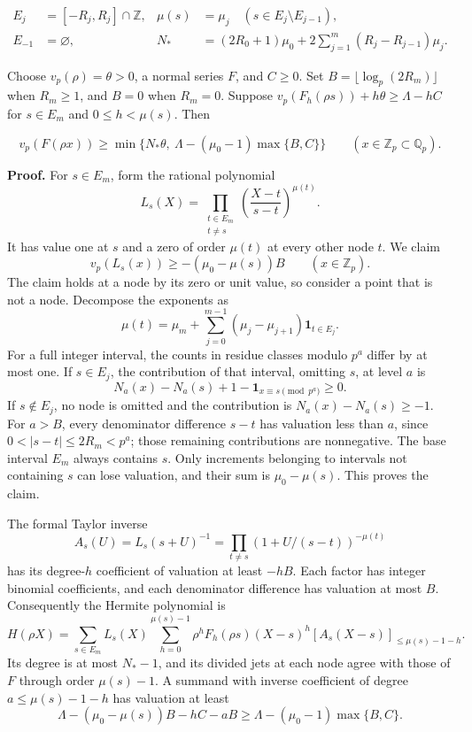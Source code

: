 \documentclass[
  11pt,
  a4paper,
]{article}
\begin{document}
\[
\begin{aligned}
E_j&=[-R_j,R_j]\cap\mathbb Z,&
\mu(s)&=\mu_j\quad(s\in E_j\setminus E_{j-1}),\\
E_{-1}&=\varnothing,&
N_*&=(2R_0+1)\mu_0+
2\sum_{j=1}^m(R_j-R_{j-1})\mu_j .
\end{aligned}
\tag{10.247}
\]

Choose \(v_p(\rho)=\theta>0\), a normal series \(F\), and \(C\ge0\). Set
\(B=\lfloor\log_p(2R_m)\rfloor\) when \(R_m\ge1\), and \(B=0\) when
\(R_m=0\). Suppose \(v_p(F_h(\rho s))+h\theta\ge\Lambda-hC\) for
\(s\in E_m\) and \(0\le h<\mu(s)\). Then

\[
v_p(F(\rho x))\ge
\min\{N_*\theta,\ \Lambda-(\mu_0-1)\max\{B,C\}\}
\qquad(x\in\mathbb Z_p\subset\mathbb Q_p).
\tag{10.248}
\]

\textbf{Proof.} For \(s\in E_m\), form the rational polynomial \[
L_s(X)=\prod_{\substack{t\in E_m\\t\ne s}}
\left(\frac{X-t}{s-t}\right)^{\mu(t)}.
\] It has value one at \(s\) and a zero of order \(\mu(t)\) at every
other node \(t\). We claim \[
v_p(L_s(x))\ge-(\mu_0-\mu(s))B\qquad(x\in\mathbb Z_p).
\] The claim holds at a node by its zero or unit value, so consider a
point that is not a node. Decompose the exponents as \[
\mu(t)=\mu_m+\sum_{j=0}^{m-1}(\mu_j-\mu_{j+1})\mathbf1_{t\in E_j}.
\] For a full integer interval, the counts in residue classes modulo
\(p^a\) differ by at most one. If \(s\in E_j\), the contribution of that
interval, omitting \(s\), at level \(a\) is \[
N_a(x)-N_a(s)+1-\mathbf1_{x\equiv s\pmod{p^a}}\ge0.
\] If \(s\notin E_j\), no node is omitted and the contribution is
\(N_a(x)-N_a(s)\ge-1\). For \(a>B\), every denominator difference
\(s-t\) has valuation less than \(a\), since \(0<|s-t|\le2R_m<p^a\);
those remaining contributions are nonnegative. The base interval \(E_m\)
always contains \(s\). Only increments belonging to intervals not
containing \(s\) can lose valuation, and their sum is \(\mu_0-\mu(s)\).
This proves the claim.

The formal Taylor inverse \[
A_s(U)=L_s(s+U)^{-1}
=\prod_{t\ne s}(1+U/(s-t))^{-\mu(t)}
\] has its degree-\(h\) coefficient of valuation at least \(-hB\). Each
factor has integer binomial coefficients, and each denominator
difference has valuation at most \(B\). Consequently the Hermite
polynomial is \[
H(\rho X)=\sum_{s\in E_m}L_s(X)
\sum_{h=0}^{\mu(s)-1}\rho^h F_h(\rho s)(X-s)^h
[A_s(X-s)]_{\le\mu(s)-1-h}.
\] Its degree is at most \(N_*-1\), and its divided jets at each node
agree with those of \(F\) through order \(\mu(s)-1\). A summand with
inverse coefficient of degree \(a\le\mu(s)-1-h\) has valuation at least
\[
\Lambda-(\mu_0-\mu(s))B-hC-aB
\ge\Lambda-(\mu_0-1)\max\{B,C\}.
\]
\end{document}
